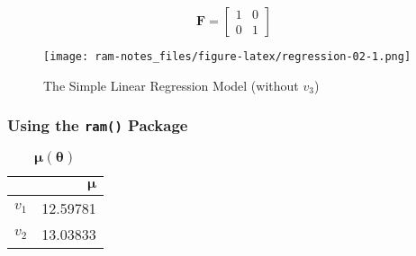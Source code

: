 \documentclass[
]{book}
\newenvironment{Shaded}{\begin{snugshade}}{\end{snugshade}}
\newcommand{\AttributeTok}[1]{\textcolor[rgb]{0.77,0.63,0.00}{#1}}
\newcommand{\ConstantTok}[1]{\textcolor[rgb]{0.00,0.00,0.00}{#1}}
\newcommand{\FunctionTok}[1]{\textcolor[rgb]{0.00,0.00,0.00}{#1}}
\newcommand{\NormalTok}[1]{#1}
\newcommand{\SpecialCharTok}[1]{\textcolor[rgb]{0.00,0.00,0.00}{#1}}
\newcommand{\StringTok}[1]{\textcolor[rgb]{0.31,0.60,0.02}{#1}}
\begin{document}
\begin{equation}
  \mathbf{F}
  =
  \begin{bmatrix}
    1 & 0 \\
    0 & 1
  \end{bmatrix}
\end{equation}

\begin{figure}
\centering
\texttt{[image: ram-notes\_files/figure-latex/regression-02-1.png]}
\caption{\label{fig:regression-02}The Simple Linear Regression Model (without \(v_3\))}
\end{figure}

\hypertarget{using-the-ram-package-1}{%
\subsubsection{\texorpdfstring{Using the \texttt{ram()} Package}{Using the ram() Package}}\label{using-the-ram-package-1}}

\begin{Shaded}
\end{Shaded}

\begin{table}

\caption{\label{tab:unnamed-chunk-6}$\boldsymbol{\mu} \left( \boldsymbol{\theta} \right)$}
\centering
\begin{tabular}[t]{l|r}
\hline
  & $\boldsymbol{\mu}$\\
\hline
$v_1$ & 12.59781\\
\hline
$v_2$ & 13.03833\\
\hline
\end{tabular}
\end{table}
\end{document}
